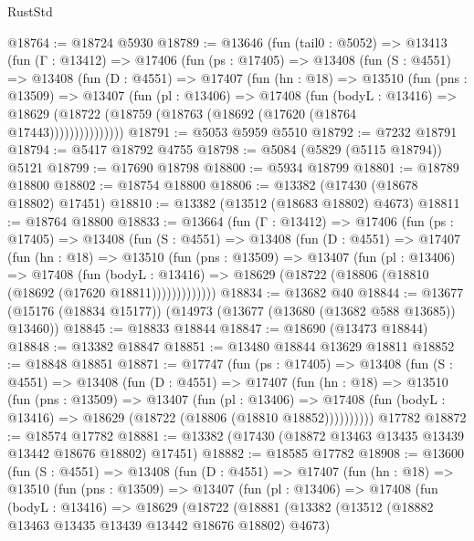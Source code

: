 \begin{lexlean}{RustStd}
\begin{coremodule}
@18764 := @18724 @5930
@18789 := @13646
    (fun (tail0 : @5052) =>
    @13413
      (fun (Γ : @13412) =>
      @17406
        (fun (ps : @17405) =>
        @13408
          (fun (S : @4551) =>
          @13408
            (fun (D : @4551) =>
            @17407
              (fun (hn : @18) =>
              @13510
                (fun (pns : @13509) =>
                @13407
                  (fun (pl : @13406) =>
                  @17408
                    (fun (bodyL : @13416) =>
                    @18629 (@18722 (@18759 (@18763 (@18692 (@17620 (@18764 @17443)))))))))))))))
@18791 := @5053 @5959 @5510
@18792 := @7232 @18791
@18794 := @5417 @18792 @4755
@18798 := @5084 (@5829 (@5115 @18794)) @5121
@18799 := @17690 @18798
@18800 := @5934 @18799
@18801 := @18789 @18800
@18802 := @18754 @18800
@18806 := @13382 (@17430 (@18678 @18802) @17451)
@18810 := @13382 (@13512 (@18683 @18802) @4673)
@18811 := @18764 @18800
@18833 := @13664
    (fun (Γ : @13412) =>
    @17406
      (fun (ps : @17405) =>
      @13408
        (fun (S : @4551) =>
        @13408
          (fun (D : @4551) =>
          @17407
            (fun (hn : @18) =>
            @13510
              (fun (pns : @13509) =>
              @13407
                (fun (pl : @13406) =>
                @17408
                  (fun (bodyL : @13416) =>
                  @18629 (@18722 (@18806 (@18810 (@18692 (@17620 @18811)))))))))))))
@18834 := @13682 @40
@18844 := @13677 (@15176 (@18834 @15177)) (@14973 (@13677 (@13680 (@13682 @588 @13685)) @13460))
@18845 := @18833 @18844
@18847 := @18690 (@13473 @18844)
@18848 := @13382 @18847
@18851 := @13480 @18844 @13629 @18811
@18852 := @18848 @18851
@18871 := @17747
    (fun (ps : @17405) =>
    @13408
      (fun (S : @4551) =>
      @13408
        (fun (D : @4551) =>
        @17407
          (fun (hn : @18) =>
          @13510
            (fun (pns : @13509) =>
            @13407
              (fun (pl : @13406) =>
              @17408 (fun (bodyL : @13416) => @18629 (@18722 (@18806 (@18810 @18852))))))))))
    @17782
@18872 := @18574 @17782
@18881 := @13382 (@17430 (@18872 @13463 @13435 @13439 @13442 @18676 @18802) @17451)
@18882 := @18585 @17782
@18908 := @13600
    (fun (S : @4551) =>
    @13408
      (fun (D : @4551) =>
      @17407
        (fun (hn : @18) =>
        @13510
          (fun (pns : @13509) =>
          @13407
            (fun (pl : @13406) =>
            @17408
              (fun (bodyL : @13416) =>
              @18629
                (@18722
                  (@18881
                    (@13382
                      (@13512 (@18882 @13463 @13435 @13439 @13442 @18676 @18802) @4673)

\end{coremodule}
\end{lexlean}
